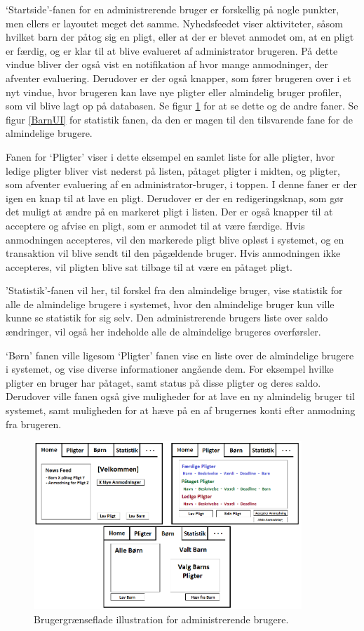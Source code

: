 ‘Startside’-fanen for en administrerende bruger er forskellig på nogle punkter, men ellers er layoutet meget det samme. Nyhedsfeedet viser aktiviteter, såsom hvilket barn der påtog sig en pligt, eller at der er blevet anmodet om, at en pligt er færdig, og er klar til at blive evalueret af administrator brugeren. På dette vindue bliver der også vist en notifikation af hvor mange anmodninger, der afventer evaluering. Derudover er der også knapper, som fører brugeren over i et nyt vindue, hvor brugeren kan lave nye pligter eller almindelig bruger profiler, som vil blive lagt op på databasen. Se figur \ref{ForalderUI} for at se dette og de andre faner. Se figur \ref{BarnUI} for statistik fanen, da den er magen til den tilsvarende fane for de almindelige brugere.

Fanen for ‘Pligter’ viser i dette eksempel en samlet liste for alle pligter, hvor ledige pligter bliver vist nederst på listen, påtaget pligter i midten, og pligter, som afventer evaluering af en administrator-bruger, i toppen. I denne faner er der igen en knap til at lave en pligt. Derudover er der en  redigeringsknap, som gør det muligt at ændre på en markeret pligt i listen. Der er også knapper til at acceptere og afvise en pligt, som er anmodet til at være færdige. Hvis anmodningen accepteres, vil den markerede pligt blive opløst i systemet, og en transaktion vil blive sendt til den pågældende bruger. Hvis anmodningen ikke accepteres, vil pligten blive sat tilbage til at være en påtaget pligt. 

'Statistik'-fanen vil her, til forskel fra den almindelige bruger, vise statistik for alle de almindelige brugere i systemet, hvor den almindelige bruger kun ville kunne se statistik for sig selv. Den administrerende brugers liste over saldo ændringer, vil også her indeholde alle de almindelige brugeres overførsler. 

‘Børn’ fanen ville ligesom ‘Pligter’ fanen vise en liste over de almindelige brugere i systemet, og vise diverse informationer angående dem. For eksempel hvilke pligter en bruger har påtaget, samt status på disse pligter og deres saldo. Derudover ville fanen også give muligheder for at lave en ny almindelig bruger til systemet, samt muligheden for at hæve på en af brugernes konti efter anmodning fra brugeren.

\begin{figure}[H]
\centering
\includegraphics[width=0.9\textwidth]{Billeder/ForalderUI.png}
\caption{Brugergrænseflade illustration for administrerende brugere.}
\label{ForalderUI}
\end{figure}
